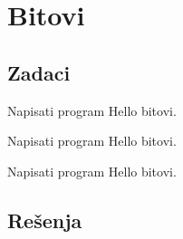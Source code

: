 
\chapter{Bitovi}

\section{Zadaci}

\begin{Exercise}[label=201]
  Napisati program Hello bitovi.
\end{Exercise}
\begin{Answer}[ref=201]
\end{Answer}

\begin{Exercise}[label=202]
  Napisati program Hello bitovi.
\end{Exercise}
\begin{Answer}[ref=202]
\end{Answer}


\begin{Exercise}[label=203]
  Napisati program Hello bitovi.
\end{Exercise}
\begin{Answer}[ref=203]
\end{Answer}



\section{Rešenja}
\shipoutAnswer
